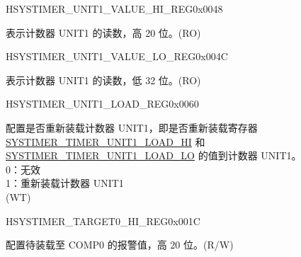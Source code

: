 \begin{register}{H}{SYSTIMER\_UNIT1\_VALUE\_HI\_REG}{0x0048}\label{regdesc:SYSTIMERUNIT1VALUEHIREG}
%
%
\regnewline%
\begin{regdesc}\begin{reglist}
\label{fielddesc:SYSTIMERTIMERUNIT1VALUEHI}\item [SYSTIMER\_TIMER\_UNIT1\_VALUE\_HI] 表示计数器 UNIT1 的读数，高 20 位。(RO)
\end{reglist}\end{regdesc}
\end{register}


\begin{register}{H}{SYSTIMER\_UNIT1\_VALUE\_LO\_REG}{0x004C}\label{regdesc:SYSTIMERUNIT1VALUELOREG}
%
\regnewline%
\begin{regdesc}\begin{reglist}
\label{fielddesc:SYSTIMERTIMERUNIT1VALUELO}\item [SYSTIMER\_TIMER\_UNIT1\_VALUE\_LO] 表示计数器 UNIT1 的读数，低 32 位。(RO)
\end{reglist}\end{regdesc}
\end{register}


\begin{register}{H}{SYSTIMER\_UNIT1\_LOAD\_REG}{0x0060}\label{regdesc:SYSTIMERUNIT1LOADREG}
%
%
\regnewline%
\begin{regdesc}\begin{reglist}
\label{fielddesc:SYSTIMERTIMERUNIT1LOAD}\item [SYSTIMER\_TIMER\_UNIT1\_LOAD] 配置是否重新装载计数器 UNIT1，即是否重新装载寄存器 \hyperref[fielddesc:SYSTIMERTIMERUNIT0LOADHI]{SYSTIMER\_TIMER\_UNIT1\_LOAD\_HI} 和 \hyperref[fielddesc:SYSTIMERTIMERUNIT0LOADLO]{SYSTIMER\_TIMER\_UNIT1\_LOAD\_LO} 的值到计数器 UNIT1。\\
0：无效 \\
1：重新装载计数器 UNIT1\\
(WT)
\end{reglist}\end{regdesc}
\end{register}


\begin{register}{H}{SYSTIMER\_TARGET0\_HI\_REG}{0x001C}\label{regdesc:SYSTIMERTARGET0HIREG}
%
%
\regnewline%
\begin{regdesc}\begin{reglist}
\label{fielddesc:SYSTIMERTIMERTARGET0HI}\item [SYSTIMER\_TIMER\_TARGET0\_HI] 配置待装载至 COMP0 的报警值，高 20 位。(R/W)
\end{reglist}\end{regdesc}
\end{register}


